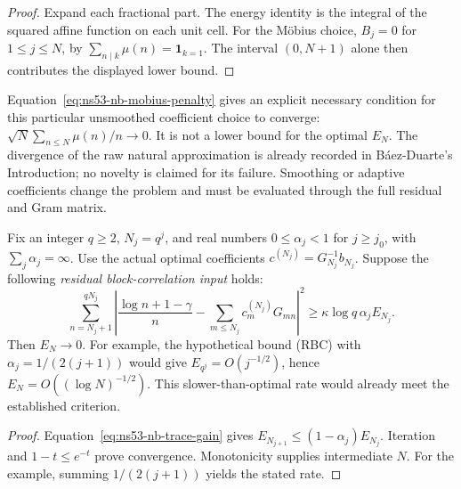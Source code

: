 \begin{proof}
Expand each fractional part. The energy identity is the integral of the
squared affine function on each unit cell. For the M\"obius choice,
$B_j=0$ for $1\leq j\leq N$, by
$\sum_{n\mid k}\mu(n)=\mathbf 1_{k=1}$. The interval $(0,N+1)$ alone
then contributes the displayed lower bound.
\end{proof}

\begin{remark}
Equation~\eqref{eq:ns53-nb-mobius-penalty} gives an explicit necessary
condition for this particular unsmoothed coefficient choice to converge:
$\sqrt N\sum_{n\leq N}\mu(n)/n\to0$. It is not a lower bound for the
optimal $E_N$. The divergence of the raw natural approximation is already
recorded in B\'aez-Duarte's Introduction; no novelty is claimed for its
failure. Smoothing or adaptive coefficients change the problem and must
be evaluated through the full residual and Gram matrix.
\end{remark}

\begin{proposition}
\label{prop:ns53-nb-any-rate}
Fix an integer $q\geq2$, $N_j=q^j$, and real numbers
$0\leq\alpha_j<1$ for $j\geq j_0$, with $\sum_j\alpha_j=\infty$.
Use the actual optimal coefficients $c^{(N_j)}=G_{N_j}^{-1}b_{N_j}$.
Suppose the following \emph{residual block-correlation input} holds:
\begin{equation}
 \sum_{n=N_j+1}^{qN_j}
 \left|\frac{\log n+1-\gamma}{n}
       -\sum_{m\leq N_j}c_m^{(N_j)}G_{mn}\right|^2
 \geq\kappa\log q\,\alpha_j E_{N_j}.
 \tag{RBC}\label{eq:ns53-nb-rbc}
\end{equation}
Then $E_N\to0$. For example, the hypothetical bound (RBC) with
$\alpha_j=1/(2(j+1))$ would give
$E_{q^j}=O(j^{-1/2})$, hence $E_N=O((\log N)^{-1/2})$.
This slower-than-optimal rate would already meet the established criterion.
\end{proposition}

\begin{proof}
Equation~\eqref{eq:ns53-nb-trace-gain} gives
$E_{N_{j+1}}\leq(1-\alpha_j)E_{N_j}$. Iteration and
$1-t\leq e^{-t}$ prove convergence. Monotonicity supplies intermediate
$N$. For the example, summing $1/(2(j+1))$ yields the stated rate.
\end{proof}

